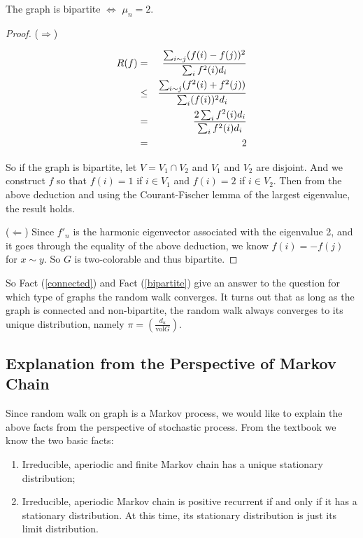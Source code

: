 \begin{fact} \label{bipartite}
The graph is bipartite $\Leftrightarrow$ $\mu_n=2$.
\end{fact}

\begin{proof}
($\Rightarrow$)

\begin{eqnarray*}
R(f) & = & \frac{\sum_{i\sim
j} (f(i)-f(j))^2}{\sum_i f^2(i) d_i} \\
& \leq & {{\sum_{i\sim j} (f^2(i)+f^2(j))}\over{\sum_i (f(i))^2 d_i}} \\
& = & \frac{2\sum_i f^2(i) d_i}{\sum_i f^2(i) d_i} \\
& = & 2
\end{eqnarray*}

So if the graph is bipartite, let $V=V_1 \cap V_2$ and $V_1$ and
$V_2$ are disjoint. And we construct $f$ so that $f(i)=1$ if $i\in
V_1$ and $f(i)=2$ if $i\in V_2$. Then from the above deduction and
using the Courant-Fischer lemma of the largest eigenvalue, the
result holds.

($\Leftarrow$) Since $f'_n$ is the harmonic eigenvector associated
with the eigenvalue 2, and it goes through the equality of the above
deduction, we know $f(i)=-f(j)$ for $x\sim y$. So $G$ is
two-colorable and thus bipartite.
\end{proof}

So Fact (\ref{connected}) and Fact (\ref{bipartite}) give an answer
to the question for which type of graphs the random walk converges.
It turns out that as long as the graph is connected and
non-bipartite, the random walk always converges to its unique
distribution, namely $\pi=(\frac{d_u}{\text{vol}G})$.

\subsection{Explanation from the Perspective of Markov Chain}
Since random walk on graph is a Markov process, we would like to
explain the above facts from the perspective of stochastic process.
From the textbook we know the two basic facts:

\begin{enumerate}
\item Irreducible, aperiodic and finite Markov chain has a unique
stationary distribution;
\item Irreducible, aperiodic Markov chain is positive recurrent if
and only if it has a stationary distribution. At this time, its
stationary distribution is just its limit distribution.
\end{enumerate}

